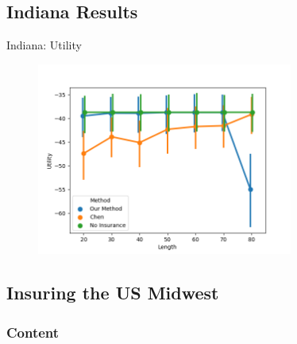 \documentclass{beamer}
\begin{document}

\subsection*{Indiana Results}
\begin{frame}{Indiana: Utility}
    \begin{figure}
        \includegraphics[width=0.75\textwidth]{../../../output/figures/Evaluation/Indiana_Average_Utility_CI.png}
    \end{figure}
\end{frame}



\subsection{Insuring the US Midwest}
\begin{frame}
    \frametitle{Content}
    \tableofcontents[currentsubsection]
  \end{frame}
\end{document}
